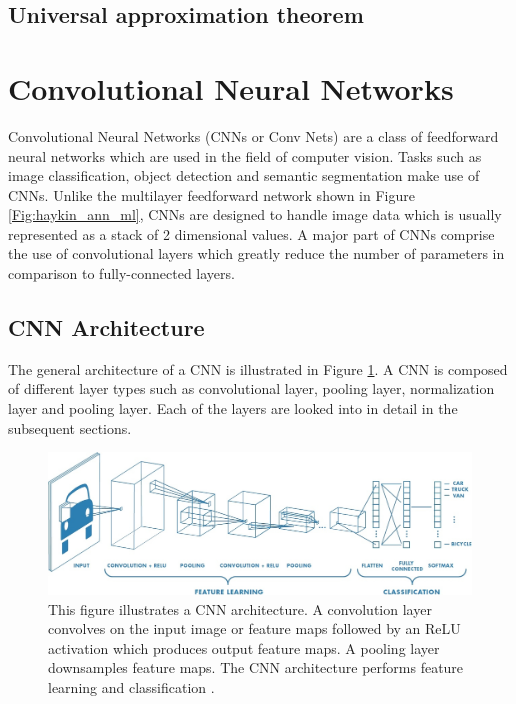 \subsection{Universal approximation theorem}



\section{Convolutional Neural Networks}

Convolutional Neural Networks (CNNs or Conv Nets) are a class of feedforward neural networks which are used in the field of computer vision. Tasks such as image classification, object detection and semantic segmentation make use of CNNs. Unlike the multilayer feedforward network shown in Figure \ref{Fig:haykin_ann_ml}, CNNs are designed to handle image data which is usually represented as a stack of 2 dimensional values. A major part of CNNs comprise the use of convolutional layers which greatly reduce the number of parameters in comparison to fully-connected layers.

\subsection{CNN Architecture}

The general architecture of a CNN is illustrated in Figure \ref{Fig:cnn_arch}. A CNN is composed of different layer types such as convolutional layer, pooling layer, normalization layer and pooling layer. Each of the layers are looked into in detail in the subsequent sections.
	
	\begin{figure}[h]
		\centering
		\includegraphics[width=1\linewidth]{images/cnn_matlab}
		\caption{This figure illustrates a CNN architecture. A convolution layer convolves on the input image or feature maps followed by an ReLU activation which produces output feature maps. A pooling layer downsamples feature maps. The CNN architecture performs feature learning and classification \cite{matlab_cnn}.}
		\label{Fig:cnn_arch}
	\end{figure}

